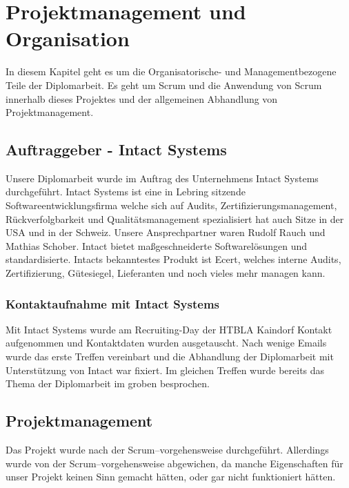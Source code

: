 
\renewcommand{\theauthor}{Matthias Franz}

\chapter{Projektmanagement und Organisation}
In diesem Kapitel geht es um die Organisatorische- und Managementbezogene Teile der Diplomarbeit. Es geht um Scrum und die Anwendung von Scrum innerhalb dieses Projektes und der allgemeinen Abhandlung von Projektmanagement.

\label{sec:ProjUOrg}

\section{Auftraggeber - Intact Systems}
\label{sec:Auftraggeber}
Unsere Diplomarbeit wurde im Auftrag des Unternehmens Intact Systems durchgeführt. Intact Systems ist eine in Lebring sitzende Softwareentwicklungsfirma welche sich auf Audits, Zertifizierungsmanagement, Rückverfolgbarkeit und Qualitätsmanagement spezialisiert hat auch Sitze in der USA und in der Schweiz. Unsere Ansprechpartner waren Rudolf Rauch und Mathias Schober. Intact bietet maßgeschneiderte Softwarelösungen und standardisierte. Intacts bekanntestes Produkt ist Ecert, welches interne Audits, Zertifizierung, Gütesiegel, Lieferanten und noch vieles mehr managen kann.
	\subsection*{Kontaktaufnahme mit Intact Systems}
	Mit Intact Systems wurde am Recruiting-Day der HTBLA Kaindorf Kontakt aufgenommen und Kontaktdaten wurden ausgetauscht. Nach wenige Emails wurde das erste Treffen vereinbart und die Abhandlung der Diplomarbeit mit Unterstützung von Intact war fixiert. Im gleichen Treffen wurde bereits das Thema der Diplomarbeit im groben besprochen.  
	
\section{Projektmanagement}
\label{sec:Projektmanagement}
Das Projekt wurde nach der Scrum--vorgehensweise durchgeführt. Allerdings wurde von der Scrum--vorgehensweise abgewichen, da manche Eigenschaften für unser Projekt keinen Sinn gemacht hätten, oder gar nicht funktioniert hätten.
